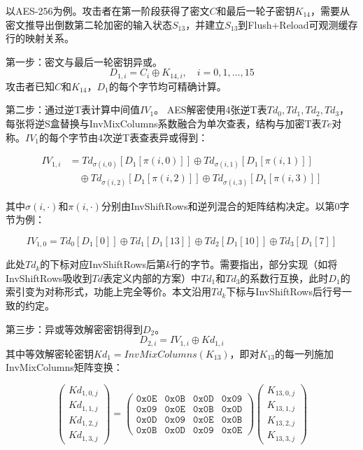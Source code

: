 以AES-256为例。攻击者在第一阶段获得了密文$C$和最后一轮子密钥$K_{14}$，需要从密文推导出倒数第二轮加密的输入状态$S_{13}$，并建立$S_{13}$到Flush+Reload可观测缓存行的映射关系。

第一步：密文与最后一轮密钥异或。
\begin{equation}
D_{1,i} = C_i \oplus K_{14,i}, \quad i = 0, 1, \dots, 15
\end{equation}
攻击者已知$C$和$K_{14}$，$D_1$的每个字节均可精确计算。

第二步：通过逆T表计算中间值$IV_1$。
AES解密使用4张逆T表$Td_0, Td_1, Td_2, Td_3$，每张将逆S盒替换与InvMixColumns系数融合为单次查表，结构与加密T表$Te$对称。$IV_1$的每个字节由4次逆T表查表异或得到：

\begin{align}
IV_{1,i} &= Td_{\sigma(i,0)}[D_1[\pi(i,0)]] \oplus Td_{\sigma(i,1)}[D_1[\pi(i,1)]] \nonumber \\
&\quad \oplus Td_{\sigma(i,2)}[D_1[\pi(i,2)]] \oplus Td_{\sigma(i,3)}[D_1[\pi(i,3)]]
\end{align}

其中$\sigma(i,\cdot)$和$\pi(i,\cdot)$分别由InvShiftRows和逆列混合的矩阵结构决定。以第0字节为例：

\begin{equation}
IV_{1,0} = Td_0[D_1[0]] \oplus Td_1[D_1[13]] \oplus Td_2[D_1[10]] \oplus Td_3[D_1[7]]
\end{equation}

此处$Td_k$的下标对应InvShiftRows后第$k$行的字节。需要指出，部分实现（如将InvShiftRows吸收到$Td$表定义内部的方案）中$Td_1$和$Td_3$的系数行互换，此时$D_1$的索引变为对称形式，功能上完全等价。本文沿用$Td_k$下标与InvShiftRows后行号一致的约定。

第三步：异或等效解密密钥得到$D_2$。
\begin{equation}
D_{2,i} = IV_{1,i} \oplus Kd_{1,i}
\end{equation}
其中等效解密轮密钥$Kd_1 = InvMixColumns(K_{13})$，即对$K_{13}$的每一列施加InvMixColumns矩阵变换：

\begin{equation}
\begin{pmatrix} Kd_{1,0,j} \\ Kd_{1,1,j} \\ Kd_{1,2,j} \\ Kd_{1,3,j} \end{pmatrix} =
\begin{pmatrix} \mathtt{0x0E} & \mathtt{0x0B} & \mathtt{0x0D} & \mathtt{0x09} \\ \mathtt{0x09} & \mathtt{0x0E} & \mathtt{0x0B} & \mathtt{0x0D} \\ \mathtt{0x0D} & \mathtt{0x09} & \mathtt{0x0E} & \mathtt{0x0B} \\ \mathtt{0x0B} & \mathtt{0x0D} & \mathtt{0x09} & \mathtt{0x0E} \end{pmatrix}
\begin{pmatrix} K_{13,0,j} \\ K_{13,1,j} \\ K_{13,2,j} \\ K_{13,3,j} \end{pmatrix}
\end{equation}

